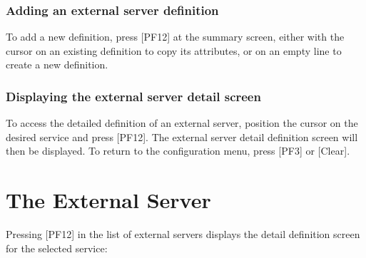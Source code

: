 \documentclass[letterpaper,10pt,english]{sphinxmanual}
\begin{document}
\subsection{Adding an external server definition}
\label{\detokenize{connectivity_guide:adding-an-external-server-definition}}
To add a new definition, press {[}PF12{]} at the summary screen, either with the cursor on an existing definition to copy its attributes, or on an empty line to create a new definition.


\subsection{Displaying the external server detail screen}
\label{\detokenize{connectivity_guide:displaying-the-external-server-detail-screen}}
To access the detailed definition of an external server, position the cursor on the desired service and press {[}PF12{]}. The external server detail definition screen will then be displayed. To return to the configuration menu, press {[}PF3{]} or {[}Clear{]}.


\chapter{The External Server}
\label{\detokenize{connectivity_guide:the-external-server}}
Pressing {[}PF12{]} in the list of external servers displays the detail definition screen for the selected service:

\end{document}
